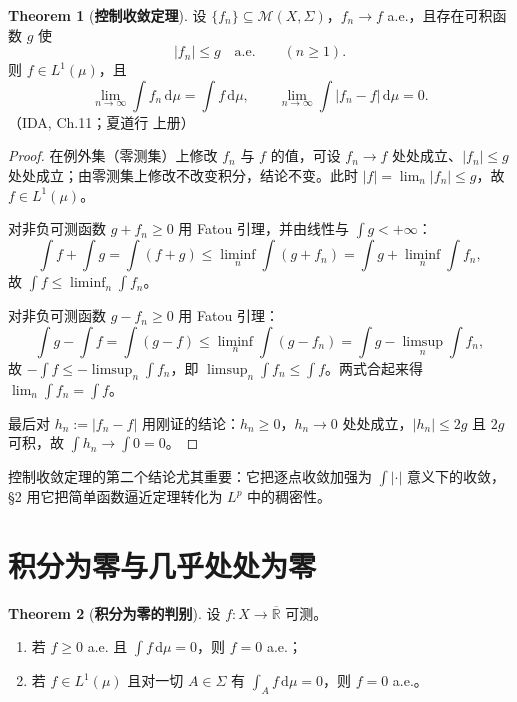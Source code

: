 \documentclass[oneside]{book}
\theoremstyle{definition}
\newcommand{\R}{\mathbb{R}}
\newcommand{\dd}{\mathrm{d}}
\theoremstyle{definition}
\newtheorem{theorem}{Theorem}[section]
\begin{document}
	\begin{theorem}[\bfseries{控制收敛定理}]
		设 $\{f_n\}\subseteq\mathcal{M}(X,\Sigma)$，$f_n\to f$ a.e.，且存在可积函数 $g$ 使
		\[
		|f_n|\leqslant g\quad\text{a.e.}\qquad(n\geqslant1).
		\]
		则 $f\in L^{1}(\mu)$，且
		\[
		\lim_{n\to\infty}\int f_n\,\dd\mu=\int f\,\dd\mu,\qquad \lim_{n\to\infty}\int|f_n-f|\,\dd\mu=0 .
		\]
		（IDA, Ch.11；夏道行 上册）
	\end{theorem}
	
	\begin{proof}
		在例外集（零测集）上修改 $f_n$ 与 $f$ 的值，可设 $f_n\to f$ 处处成立、$|f_n|\leqslant g$ 处处成立；由零测集上修改不改变积分，结论不变。此时 $|f|=\lim_n|f_n|\leqslant g$，故 $f\in L^{1}(\mu)$。
		
		对非负可测函数 $g+f_n\geqslant0$ 用 Fatou 引理，并由线性与 $\int g<+\infty$：
		\[
		\int f+\int g=\int(f+g)\leqslant\liminf_{n}\int(g+f_n)=\int g+\liminf_n\int f_n ,
		\]
		故 $\int f\leqslant\liminf_n\int f_n$。
		
		对非负可测函数 $g-f_n\geqslant0$ 用 Fatou 引理：
		\[
		\int g-\int f=\int(g-f)\leqslant\liminf_n\int(g-f_n)=\int g-\limsup_n\int f_n ,
		\]
		故 $-\int f\leqslant-\limsup_n\int f_n$，即 $\limsup_n\int f_n\leqslant\int f$。两式合起来得 $\lim_n\int f_n=\int f$。
		
		最后对 $h_n:=|f_n-f|$ 用刚证的结论：$h_n\geqslant0$，$h_n\to0$ 处处成立，$|h_n|\leqslant2g$ 且 $2g$ 可积，故 $\int h_n\to\int0=0$。
	\end{proof}
	
	控制收敛定理的第二个结论尤其重要：它把逐点收敛加强为 $\int|\cdot|$ 意义下的收敛，\S2 用它把简单函数逼近定理转化为 $L^{p}$ 中的稠密性。
	
	\section{积分为零与几乎处处为零}
	
	\begin{theorem}[\bfseries{积分为零的判别}]
		设 $f:X\to\overline{\R}$ 可测。
		\begin{enumerate}
			\item 若 $f\geqslant0$ a.e. 且 $\int f\,\dd\mu=0$，则 $f=0$ a.e.；
			\item 若 $f\in L^{1}(\mu)$ 且对一切 $A\in\Sigma$ 有 $\int_A f\,\dd\mu=0$，则 $f=0$ a.e.。
		\end{enumerate}
	\end{theorem}
	
\end{document}
